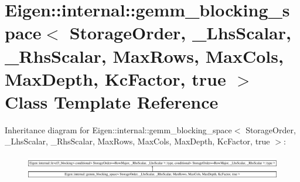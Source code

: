 \hypertarget{class_eigen_1_1internal_1_1gemm__blocking__space_3_01_storage_order_00_01___lhs_scalar_00_01___reb401dd40e11c548a7d5e4b85e19f682}{}\section{Eigen\+::internal\+::gemm\+\_\+blocking\+\_\+space$<$ Storage\+Order, \+\_\+\+Lhs\+Scalar, \+\_\+\+Rhs\+Scalar, Max\+Rows, Max\+Cols, Max\+Depth, Kc\+Factor, true $>$ Class Template Reference}
\label{class_eigen_1_1internal_1_1gemm__blocking__space_3_01_storage_order_00_01___lhs_scalar_00_01___reb401dd40e11c548a7d5e4b85e19f682}
Inheritance diagram for Eigen\+::internal\+::gemm\+\_\+blocking\+\_\+space$<$ Storage\+Order, \+\_\+\+Lhs\+Scalar, \+\_\+\+Rhs\+Scalar, Max\+Rows, Max\+Cols, Max\+Depth, Kc\+Factor, true $>$\+:\begin{figure}[H]
\begin{center}
\leavevmode
\includegraphics[height=1.067683cm]{class_eigen_1_1internal_1_1gemm__blocking__space_3_01_storage_order_00_01___lhs_scalar_00_01___reb401dd40e11c548a7d5e4b85e19f682}
\end{center}
\end{figure}
